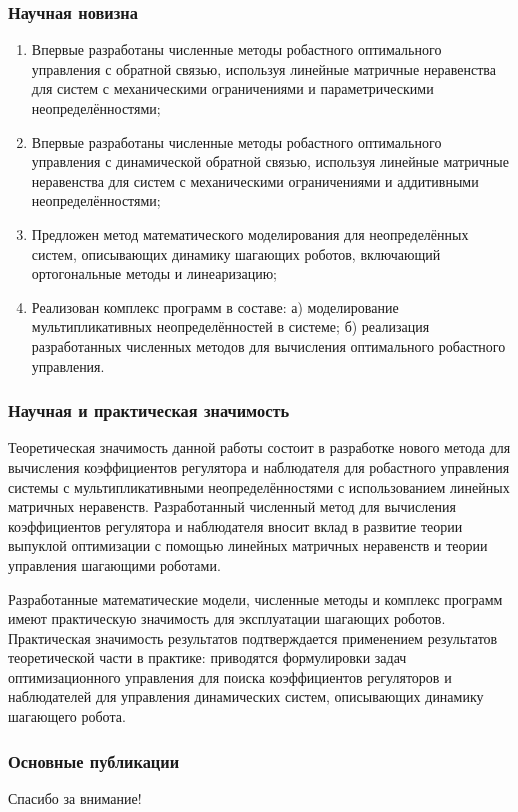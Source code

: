 \begin{frame}
    \frametitle{Научная новизна}
\begin{enumerate}
	\item Впервые разработаны численные методы робастного оптимального управления с обратной связью, используя линейные матричные неравенства для систем с механическими ограничениями и параметрическими неопределённостями;
	\item Впервые разработаны численные методы робастного оптимального управления с динамической обратной связью, используя линейные матричные неравенства для систем с механическими ограничениями и аддитивными неопределённостями;
	\item Предложен метод математического моделирования для неопределённых систем, описывающих динамику шагающих роботов, включающий ортогональные методы и линеаризацию;
	\item Реализован комплекс программ в составе: а) моделирование мультипликативных неопределённостей в системе; б) реализация разработанных численных методов для вычисления оптимального робастного управления.
\end{enumerate}
\end{frame}

\begin{frame}
    \frametitle{Научная и практическая значимость}
	Теоретическая значимость данной работы состоит в разработке нового метода для вычисления коэффициентов регулятора и наблюдателя для робастного управления системы с мультипликативными неопределённостями с использованием линейных матричных неравенств. Разработанный численный метод для вычисления коэффициентов регулятора и наблюдателя вносит вклад в развитие теории выпуклой оптимизации с помощью линейных матричных неравенств и теории управления шагающими роботами.
	
	Разработанные математические модели, численные методы и комплекс программ имеют практическую значимость для эксплуатации шагающих роботов. Практическая значимость результатов подтверждается применением результатов теоретической части в практике: приводятся формулировки задач оптимизационного управления для поиска коэффициентов регуляторов и наблюдателей для управления динамических систем, описывающих динамику шагающего робота. 
\end{frame}

\begin{frame} %
    \frametitle{Основные публикации}
    \nocite{scbib1}%
 
    \nocite{bib1}%
\end{frame}

\begin{frame} %
    \begin{center}
        \Huge
        Спасибо за внимание!
    \end{center}
\end{frame}
